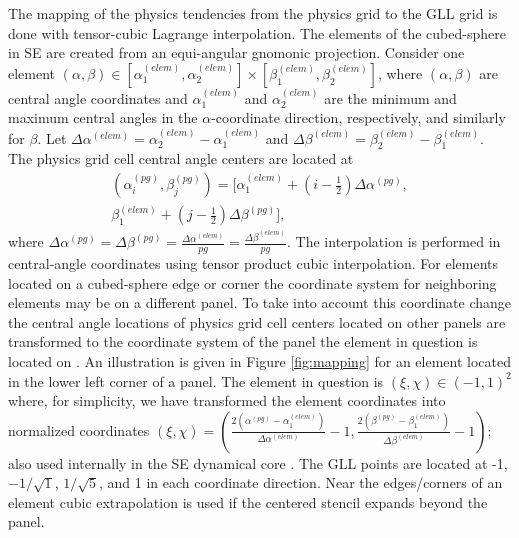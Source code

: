 \documentclass{ametsoc}
\begin{document}
{%
%
\appendix
The mapping of the physics tendencies from the physics grid to the GLL grid is done with tensor-cubic Lagrange interpolation. The elements of the cubed-sphere in SE are created from an equi-angular gnomonic projection. Consider one element $(\alpha,\beta) \in \left[ \alpha^{(elem)}_1,\alpha^{(elem)}_2 \right]\times \left[ \beta^{(elem)}_1,\beta^{(elem)}_2\right]$, where $(\alpha,\beta)$ are central angle coordinates and $\alpha^{(elem)}_1$ and $\alpha^{(elem)}_2$ are the minimum and maximum central angles in the $\alpha$-coordinate direction, respectively, and similarly for $\beta$. Let $\Delta \alpha^{(elem)}=\alpha^{(elem)}_2-\alpha^{(elem)}_1$ and $\Delta \beta^{(elem)}=\beta^{(elem)}_2-\beta^{(elem)}_1$. The physics grid cell central angle centers are located at
\begin{multline}
(\alpha^{(pg)}_i,\beta^{(pg)}_j)= \Big[ \alpha^{(elem)}_1+\left(i-\tfrac{1}{2}\right) \Delta \alpha^{(pg)},\\
                                      \beta^{(elem)}_1+\left(j-\tfrac{1}{2}\right) \Delta \beta^{(pg)}\Big],
\end{multline}
where $\Delta \alpha^{(pg)}=\Delta \beta^{(pg)}=\frac{\Delta \alpha^{(elem)}}{pg}=\frac{\Delta \beta^{(elem)}}{pg}$. The interpolation is performed in central-angle coordinates using tensor product cubic interpolation. For elements located on a cubed-sphere edge or corner the coordinate system for neighboring elements may be on a different panel. To take into account this coordinate change the central angle locations of physics grid cell centers located on other panels are transformed to the coordinate system of the panel the element in question is located on \cite[the transformations are given in, e.g.,  ][]{NTL2005MWRb}. An illustration is given in Figure \ref{fig:mapping} for an element located in the lower left corner of a panel. The element in question is $(\xi,\chi)\in (-1,1)^2$ where, for simplicity, we have transformed the element coordinates into normalized coordinates $(\xi,\chi) = \left( \frac{ 2\left(\alpha^{(pg)}-\alpha^{(elem)}_1\right)}{\Delta \alpha^{(elem)}}-1,\frac{2\left( \beta^{(pg)}-\beta^{(elem)}_1\right)}{\Delta \beta^{(elem)}}-1\right)$; also used internally in the SE dynamical core \citep[see, e.g., section 3.3 in ][]{LetAl2018JAMES}. The GLL points are located at -1,$-1/\sqrt{1}$, $1/\sqrt{5}$, and 1 in each coordinate direction. Near the edges/corners of an element cubic extrapolation is used if the centered stencil expands beyond the panel.

}
\end{document}
